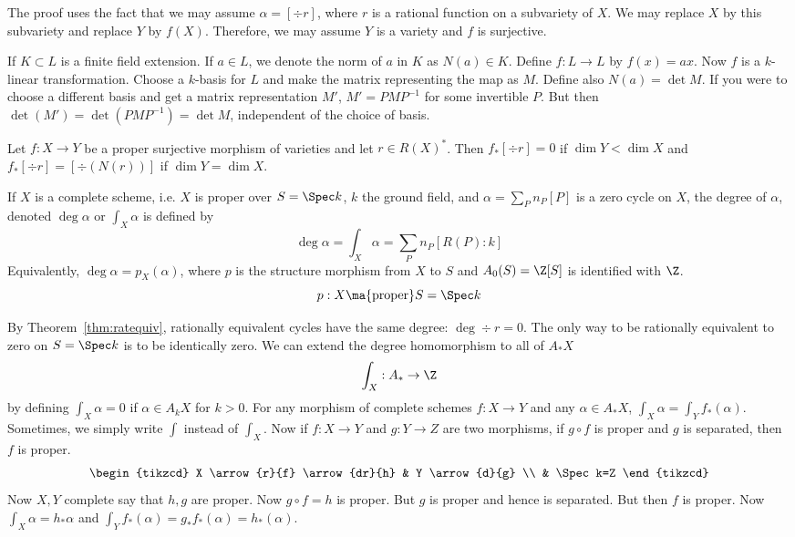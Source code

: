 The proof uses the fact that we may assume $\alpha=[\div r]$, where $r$ is a rational function on a subvariety of $X$. We may replace $X$ by this subvariety and replace $Y$ by $f(X)$. Therefore, we may assume $Y$ is a variety and $f$ is surjective. 


If $K \subset L$ is a finite field extension. If $a \in L$, we denote the norm of $a$ in $K$ as $N(a) \in K$. Define $f: L \to L$ by $f(x)=ax$. Now $f$ is a $k$-linear transformation. Choose a $k$-basis for $L$ and make the matrix representing the map as $M$. Define also $N(a)=\det M$. If you were to choose a different basis and get a matrix representation $M'$, $M'=PMP^{-1}$ for some invertible $P$. But then $\det(M')=\det(PMP^{-1})=\det M$, independent of the choice of basis.  


\begin{prop}
Let $f: X \to Y$ be a proper surjective morphism of varieties and let $r \in R(X)^*$. Then $f_*[\div r]=0$ if $\dim Y <\dim X$ and $f_*[\div r]=[\div(N(r))]$ if $\dim Y=\dim X$.
\end{prop}


\begin{dfn}
If $X$ is a complete scheme, i.e. $X$ is proper over $S=\Spec k$, $k$ the ground field, and $\alpha=\sum_P n_P[P]$ is a zero cycle on $X$, the degree of $\alpha$, denoted $\deg \alpha$ or $\int_X \alpha$ is defined by 
	\[
	\deg \alpha = \int_X \alpha = \sum_P n_P [R(P):k] 
	\]
Equivalently, $\deg \alpha = p_X(\alpha)$, where $p$ is the structure morphism from $X$ to $S$ and $A_0(S)=\Z[S]$ is identified with $\Z$.
	\[
	p: X \ma{\text{proper}} S=\Spec k
	\]
\end{dfn}


By Theorem~\ref{thm:ratequiv}, rationally equivalent cycles have the same degree: $\deg \div r=0$. The only way to be rationally equivalent to zero on $S=\Spec k$ is to be identically zero. We can extend the degree homomorphism to all of $A_*X$
	\[
	\int_X: A_* \to \Z
	\]
by defining $\int_X \alpha=0$ if $\alpha \in A_k X$ for $k>0$. For any morphism of complete schemes $f: X \to Y$ and any $\alpha \in A_* X$, $\int_X \alpha=\int_Y f_*(\alpha)$. Sometimes, we simply write $\int$ instead of $\int_X$. Now if $f: X \to Y$ and $g: Y \to Z$ are two morphisms, if $g \circ f$ is proper and $g$ is separated, then $f$ is proper.
	\[
	\begin{tikzcd}
	X \arrow{r}{f} \arrow{dr}{h} & Y \arrow{d}{g} \\
	& \Spec k=Z
	\end{tikzcd}
	\]
Now $X,Y$ complete say that $h,g$ are proper. Now $g \circ f=h$ is proper. But $g$ is proper and hence is separated. But then $f$ is proper. Now $\int_X \alpha=h_*\alpha$ and $\int_Y f_*(\alpha)=g_*f_*(\alpha)=h_*(\alpha)$. 


